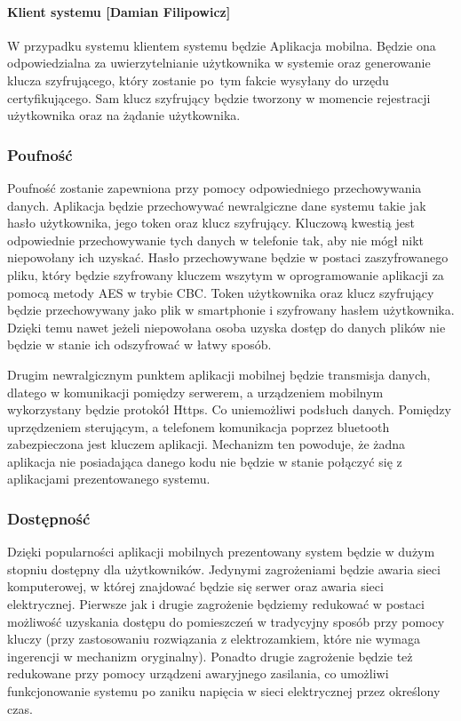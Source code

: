 \paragraph*{Klient systemu [Damian Filipowicz]}
W przypadku systemu \NazwaSys \space klientem systemu będzie Aplikacja mobilna. Będzie ona odpowiedzialna za uwierzytelnianie użytkownika w systemie oraz generowanie klucza szyfrującego, który zostanie po~tym fakcie wysyłany do urzędu certyfikującego. Sam klucz szyfrujący będzie tworzony w momencie rejestracji użytkownika oraz na żądanie użytkownika\cite{PKI}.

\subsubsection{Poufność}
Poufność zostanie zapewniona przy pomocy odpowiedniego przechowywania danych. Aplikacja będzie przechowywać newralgiczne dane systemu takie jak hasło użytkownika, jego token oraz klucz szyfrujący. Kluczową kwestią jest odpowiednie przechowywanie tych danych w telefonie tak, aby nie mógł nikt niepowołany ich uzyskać. Hasło przechowywane będzie w postaci zaszyfrowanego pliku, który będzie szyfrowany kluczem wszytym w oprogramowanie aplikacji za pomocą metody AES w trybie CBC. Token użytkownika oraz klucz szyfrujący będzie przechowywany jako plik w smartphonie i szyfrowany hasłem użytkownika. Dzięki temu nawet jeżeli niepowołana osoba uzyska dostęp do danych plików nie będzie w stanie ich odszyfrować w łatwy sposób.

Drugim newralgicznym punktem aplikacji mobilnej będzie transmisja danych, dlatego w komunikacji pomiędzy serwerem, a urządzeniem mobilnym wykorzystany będzie protokół Https. Co uniemożliwi podsłuch danych. Pomiędzy uprzędzeniem sterującym, a telefonem komunikacja poprzez bluetooth zabezpieczona jest kluczem aplikacji. Mechanizm ten powoduje, że żadna aplikacja nie posiadająca danego kodu nie będzie w stanie połączyć się z aplikacjami prezentowanego systemu.	

\subsubsection{Dostępność}
Dzięki popularności aplikacji mobilnych prezentowany system będzie w dużym stopniu dostępny dla użytkowników. Jedynymi zagrożeniami będzie awaria sieci komputerowej, w której znajdować będzie się serwer oraz awaria sieci elektrycznej. Pierwsze jak i drugie zagrożenie będziemy redukować w postaci możliwość uzyskania dostępu do pomieszczeń w tradycyjny sposób przy pomocy kluczy (przy zastosowaniu rozwiązania z elektrozamkiem, które nie wymaga ingerencji w mechanizm oryginalny). Ponadto drugie zagrożenie będzie też redukowane przy pomocy urządzeni awaryjnego zasilania, co umożliwi funkcjonowanie systemu po zaniku napięcia w sieci elektrycznej przez określony czas.
